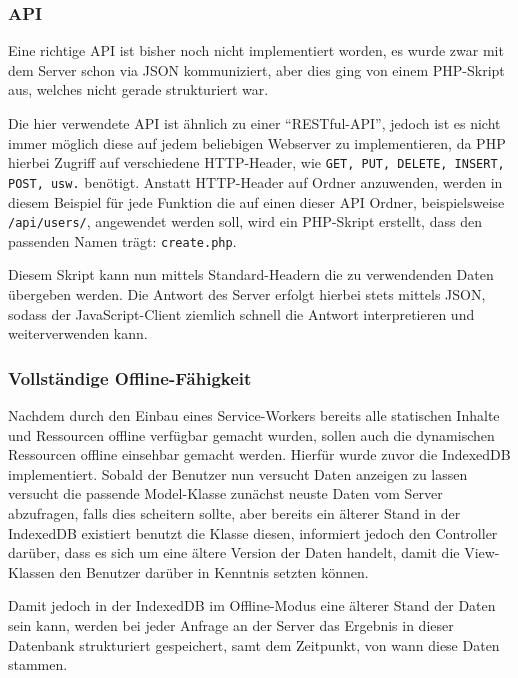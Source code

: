 \documentclass[a4paper,12pt,ngerman,listof=numbered]{scrartcl}      %
\let\oldcite\cite
\renewcommand{\cite}[1]{\textsuperscript{\oldcite{#1}}}
\providecommand{\inlinecode}[1]{\texttt{#1}}
\begin{document}
	\subsubsection{API}
	Eine richtige API ist bisher noch nicht implementiert worden, es wurde zwar mit dem Server schon via JSON kommuniziert, aber dies ging von einem PHP-Skript aus, welches nicht gerade strukturiert war.\par
	Die hier verwendete API ist ähnlich zu einer ``RESTful-API''\cite{wikiRestful}, jedoch ist es nicht immer möglich diese auf jedem beliebigen Webserver zu implementieren, da PHP hierbei Zugriff auf verschiedene HTTP-Header, wie \inlinecode{GET, PUT, DELETE, INSERT, POST, usw.} benötigt. Anstatt HTTP-Header auf Ordner anzuwenden, werden in diesem Beispiel für jede Funktion die auf einen dieser API Ordner, beispielsweise \inlinecode{/api/users/}, angewendet werden soll, wird ein PHP-Skript erstellt, dass den passenden Namen trägt: \inlinecode{create.php}.\par Diesem Skript kann nun mittels Standard-Headern die zu verwendenden Daten übergeben werden. Die Antwort des Server erfolgt hierbei stets mittels JSON, sodass der JavaScript-Client ziemlich schnell die Antwort interpretieren und weiterverwenden kann.\par
	
	\subsubsection{Vollständige Offline-Fähigkeit}
	Nachdem durch den Einbau eines Service-Workers bereits alle statischen Inhalte und Ressourcen offline verfügbar gemacht wurden, sollen auch die dynamischen Ressourcen offline einsehbar gemacht werden. Hierfür wurde zuvor die IndexedDB implementiert. Sobald der Benutzer nun versucht Daten anzeigen zu lassen versucht die passende Model-Klasse zunächst neuste Daten vom Server abzufragen, falls dies scheitern sollte, aber bereits ein älterer Stand in der IndexedDB existiert benutzt die Klasse diesen, informiert jedoch den Controller darüber, dass es sich um eine ältere Version der Daten handelt, damit die View-Klassen den Benutzer darüber in Kenntnis setzten können.\par
	Damit jedoch in der IndexedDB im Offline-Modus eine älterer Stand der Daten sein kann, werden bei jeder Anfrage an der Server das Ergebnis in dieser Datenbank strukturiert gespeichert, samt dem Zeitpunkt, von wann diese Daten stammen.
	
\end{document}
